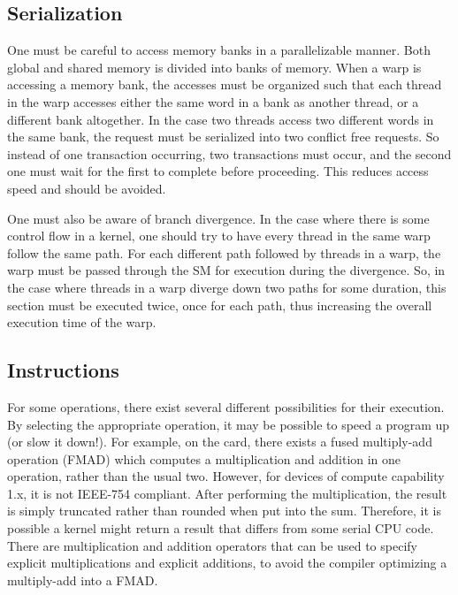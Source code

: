 \documentclass[a4paper,12pt]{report}
\begin{document}
\subsection{Serialization}
One must be careful to access memory banks in a parallelizable manner\cite[p~26]{ CUDA_C_Best_Practices_Guide}.
Both global and shared memory is divided into banks of memory.
When a warp is accessing a memory bank, the accesses must be organized such that each thread in the warp accesses either the same word in a bank as another thread, or a different bank altogether.
In the case two threads access two different words in the same bank, the request must be serialized into two conflict free requests.
So instead of one transaction occurring, two transactions must occur, and the second one must wait for the first to complete before proceeding.
This reduces access speed and should be avoided.

One must also be aware of branch divergence\cite[p~95]{ CUDA_C_Programming_Guide}.
In the case where there is some control flow in a kernel, one should try to have every thread in the same warp follow the same path.
For each different path followed by threads in a warp, the warp must be passed through the SM for execution during the divergence.
So, in the case where threads in a warp diverge down two paths for some duration, this section must be executed twice, once for each path, thus increasing the overall execution time of the warp.


\subsection{Instructions}
For some operations, there exist several different possibilities for their execution\cite[p~46]{ CUDA_C_Best_Practices_Guide}.
By selecting the appropriate operation, it may be possible to speed a program up (or slow it down!).
For example, on the card, there exists a fused multiply-add operation (FMAD) which computes a multiplication and addition in one operation, rather than the usual two.
However, for devices of compute capability 1.x, it is not IEEE-754 compliant.
After performing the multiplication, the result is simply truncated rather than rounded when put into the sum.
Therefore, it is possible a kernel might return a result that differs from some serial CPU code.
There are multiplication and addition operators that can be used to specify explicit multiplications and explicit additions, to avoid the compiler optimizing a multiply-add into a FMAD.
\end{document}
